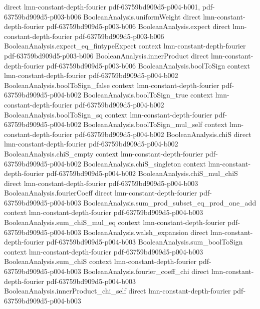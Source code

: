 \begin{lemma}
  {direct}
  {lmn-constant-depth-fourier}
  {pdf-63759bd909d5-p004-b001,
    pdf-63759bd909d5-p003-b006}
\proofstep
  {BooleanAnalysis.uniformWeight}
  {direct}
  {lmn-constant-depth-fourier}
  {pdf-63759bd909d5-p003-b006}
\proofstep
  {BooleanAnalysis.expect}
  {direct}
  {lmn-constant-depth-fourier}
  {pdf-63759bd909d5-p003-b006}
\proofstep
  {BooleanAnalysis.expect_eq_fintypeExpect}
  {context}
  {lmn-constant-depth-fourier}
  {pdf-63759bd909d5-p003-b006}
\proofstep
  {BooleanAnalysis.innerProduct}
  {direct}
  {lmn-constant-depth-fourier}
  {pdf-63759bd909d5-p003-b006}
\proofstep
  {BooleanAnalysis.boolToSign}
  {context}
  {lmn-constant-depth-fourier}
  {pdf-63759bd909d5-p004-b002}
\proofstep
  {BooleanAnalysis.boolToSign_false}
  {context}
  {lmn-constant-depth-fourier}
  {pdf-63759bd909d5-p004-b002}
\proofstep
  {BooleanAnalysis.boolToSign_true}
  {context}
  {lmn-constant-depth-fourier}
  {pdf-63759bd909d5-p004-b002}
\proofstep
  {BooleanAnalysis.boolToSign_sq}
  {context}
  {lmn-constant-depth-fourier}
  {pdf-63759bd909d5-p004-b002}
\proofstep
  {BooleanAnalysis.boolToSign_mul_self}
  {context}
  {lmn-constant-depth-fourier}
  {pdf-63759bd909d5-p004-b002}
\proofstep
  {BooleanAnalysis.chiS}
  {direct}
  {lmn-constant-depth-fourier}
  {pdf-63759bd909d5-p004-b002}
\proofstep
  {BooleanAnalysis.chiS_empty}
  {context}
  {lmn-constant-depth-fourier}
  {pdf-63759bd909d5-p004-b002}
\proofstep
  {BooleanAnalysis.chiS_singleton}
  {context}
  {lmn-constant-depth-fourier}
  {pdf-63759bd909d5-p004-b002}
\proofstep
  {BooleanAnalysis.chiS_mul_chiS}
  {direct}
  {lmn-constant-depth-fourier}
  {pdf-63759bd909d5-p004-b003}
\proofstep
  {BooleanAnalysis.fourierCoeff}
  {direct}
  {lmn-constant-depth-fourier}
  {pdf-63759bd909d5-p004-b003}
\proofstep
  {BooleanAnalysis.sum_prod_subset_eq_prod_one_add}
  {context}
  {lmn-constant-depth-fourier}
  {pdf-63759bd909d5-p004-b003}
\proofstep
  {BooleanAnalysis.sum_chiS_mul_eq}
  {context}
  {lmn-constant-depth-fourier}
  {pdf-63759bd909d5-p004-b003}
\proofstep
  {BooleanAnalysis.walsh_expansion}
  {direct}
  {lmn-constant-depth-fourier}
  {pdf-63759bd909d5-p004-b003}
\proofstep
  {BooleanAnalysis.sum_boolToSign}
  {context}
  {lmn-constant-depth-fourier}
  {pdf-63759bd909d5-p004-b003}
\proofstep
  {BooleanAnalysis.sum_chiS}
  {context}
  {lmn-constant-depth-fourier}
  {pdf-63759bd909d5-p004-b003}
\proofstep
  {BooleanAnalysis.fourier_coeff_chi}
  {direct}
  {lmn-constant-depth-fourier}
  {pdf-63759bd909d5-p004-b003}
\proofstep
  {BooleanAnalysis.innerProduct_chi_self}
  {direct}
  {lmn-constant-depth-fourier}
  {pdf-63759bd909d5-p004-b003}

\end{lemma}
